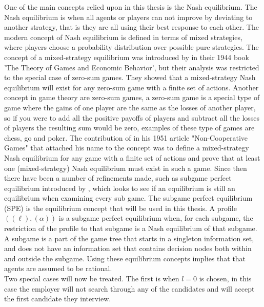 \documentclass{article}
\begin{document}
One of the main concepts relied upon in this thesis is the Nash equilibrium. The Nash equilibrium is when all agents or players can not improve by deviating to another strategy, that is they are all using their best response to each other. The modern concept of Nash equilibrium is defined in terms of mixed strategies, where players choose a probability distribution over possible pure strategies. The concept of a mixed-strategy equilibrium was introduced by \cite{von1944theory}  in their 1944 book 'The Theory of Games and Economic Behavior', but their analysis was restricted to the special case of zero-sum games. They showed that a mixed-strategy Nash equilibrium will exist for any zero-sum game with a finite set of actions. Another concept in game theory are zero-sum games, a zero-sum game is a special type of game where the gains of one player are the same as the losses of another player, so if you were to add all the positive payoffs of players and subtract all the losses of players the resulting sum would be zero, examples of these type of games are chess, go and poker. The contribution of \cite{nash1951non} in his 1951 article "Non-Cooperative Games" that attached his name to the concept was to define a mixed-strategy Nash equilibrium for any game with a finite set of actions and prove that at least one (mixed-strategy) Nash equilibrium must exist in such a game. Since then there have been a number of refinements made, such as subgame perfect equilibrium introduced by \cite{selten1965spieltheoretische}, which looks to see if an equilibrium is still an equilibrium when examining every sub game. The subgame perfect equilibrium (SPE) is the equilibrium concept that will be used in this thesis. A profile $((\ell),(\alpha))$ is a subgame perfect equilibrium when, for each subgame, the restriction of the profile to that subgame is a Nash equilibrium of that subgame. A subgame is a part of the game tree that starts in a singleton information set, and does not have an information set that contains decision nodes both within and outside the subgame. Using these equilibrium concepts implies that that agents are assumed to be rational.
\\[2ex]
Two special cases will now be treated. The first is when $l=0$ is chosen, in this case the employer will not search through any of the candidates and will accept the first candidate they interview.
\end{document}
